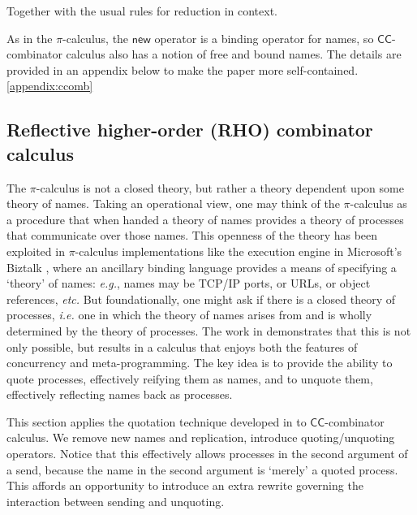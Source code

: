 \documentclass[submission,copyright,creativecommons]{eptcs}
\makeatletter
\newcommand{\new}{\mathsf{new}}
\newcommand{\pic}{$\pi$-calculus}
\newcommand{\ccomb}{$\mathsf{CC}$-combinator calculus}
\newcommand{\quotep}[1]{\mathsf{@}#1}
\newcommand{\bc}{\mathbin{\mathbf{::=}}}
\newcommand{\bm}{\mathbin{\mathbf\mid}}
\theoremstyle{definition}
\theoremstyle{remark}
\theoremstyle{remark}
\makeatother
\begin{document}
Together with the usual rules for reduction in context.

As in the {\pic}, the $\new$ operator is a binding operator for names,
so {\ccomb} also has a notion of free and bound names. The
details are provided in an appendix below to make the paper more
self-contained. \ref{appendix:ccomb}

\subsection{Reflective higher-order (RHO) combinator calculus}
The {\pic} is not a closed theory, but rather a theory dependent upon
some theory of names. Taking an operational view, one may think of the
{\pic} as a procedure that when handed a theory of names provides a
theory of processes that communicate over those names. This openness
of the theory has been exploited in {\pic} implementations like the
execution engine in Microsoft's Biztalk \cite{biztalk}, where an
ancillary binding language provides a means of specifying a `theory'
of names: {\em e.g.}, names may be TCP/IP ports, or URLs, or object
references, {\em etc.}  But foundationally, one might ask if there is
a closed theory of processes, {\em i.e.} one in which the theory of
names arises from and is wholly determined by the theory of
processes. The work in \cite{DBLP:journals/entcs/MeredithR05}
demonstrates that this is not only possible, but results in a calculus
that enjoys both the features of concurrency and meta-programming. The
key idea is to provide the ability to quote processes, effectively
reifying them as names, and to unquote them, effectively reflecting
names back as processes.

This section applies the quotation technique developed in
\cite{DBLP:journals/entcs/MeredithR05} to {\ccomb}. We remove new
names and replication, introduce quoting/unquoting operators. Notice
that this effectively allows processes in the second argument of a
send, because the name in the second argument is `merely' a quoted
process. This affords an opportunity to introduce an extra rewrite
governing the interaction between sending and unquoting.

\end{document}

